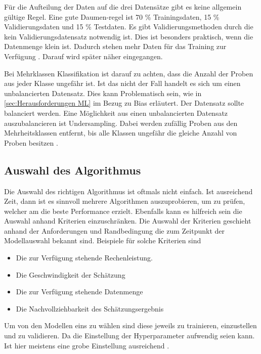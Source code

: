  Für die Aufteilung der Daten auf die drei Datensätze gibt es keine allgemein gültige Regel. Eine gute Daumen-regel ist 70 \% Trainingsdaten, 15 \% Validierungsdaten und 15 \% Testdaten. Es gibt Validierungsmethoden durch die kein Validierungsdatensatz notwendig ist. Dies ist besonders praktisch, wenn die Datenmenge klein ist. Dadurch stehen mehr Daten für das Training zur Verfügung \cite{Burkov.2019}. Darauf wird später näher eingegangen. \par

 Bei Mehrklassen Klassifikation ist darauf zu achten, dass die Anzahl der Proben aus jeder Klasse ungefähr ist. Ist das nicht der Fall handelt es sich um einen unbalancierten Datensatz. Dies kann Problematisch sein, wie in \ref{sec:Herausforderungen ML} im Bezug zu \gls{Bias} erläutert. Der Datensatz sollte balanciert werden. Eine Möglichkeit aus einen unbalancierten Datensatz auszubalancieren ist Undersampling. Dabei werden zufällig Proben aus den Mehrheitsklassen entfernt, bis alle Klassen ungefähr die gleiche Anzahl von Proben besitzen \cite{Burkov.2019}.


 \subsection{Auswahl des Algorithmus} \label{sec:ML ModellSelect}
 Die Auswahl des richtigen Algorithmus ist oftmals nicht einfach. Ist ausreichend Zeit, dann ist es sinnvoll mehrere Algorithmen auszuprobieren, um zu prüfen, welcher am die beste Performance erzielt. Ebenfalls kann es hilfreich sein die Auswahl anhand Kriterien einzuschränken. Die Auswahl der Kriterien geschieht anhand der Anforderungen und Randbedingung die zum Zeitpunkt der Modellauswahl bekannt sind. Beispiele für solche Kriterien sind

 \begin{itemize}
     \item Die zur Verfügung stehende Rechenleistung.
     \item Die Geschwindigkeit der Schätzung
     \item Die zur Verfügung stehende Datenmenge
     \item Die Nachvollziehbarkeit des Schätzungsergebnis
 \end{itemize}

 Um von den Modellen eins zu wählen sind diese jeweils zu trainieren, einzustellen und zu validieren. Da die Einstellung der \gls{Hyperparameter} aufwendig seien kann. Ist hier meistens eine grobe Einstellung ausreichend \cite{Burkov.2019, Geron.2019}.

